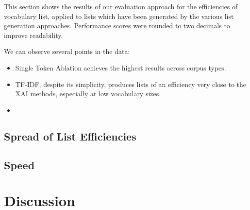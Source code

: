 This section shows the results of our evaluation approach for the efficiencies of vocabulary list, applied to lists which have been generated by the various list generation approaches. 
Performance scores were rounded to two decimals to improve readability.



%
% 	

We can observe several points in the data:

\begin{itemize}
	\item Single Token Ablation achieves the highest results across corpus types.
	\item TF-IDF, despite its simplicity, produces lists of an efficiency very close to the XAI methods, especially at low vocabulary sizes. 
	\item 
\end{itemize}

\subsection{Spread of List Efficiencies}


\subsection{Speed}



\section{Discussion}

